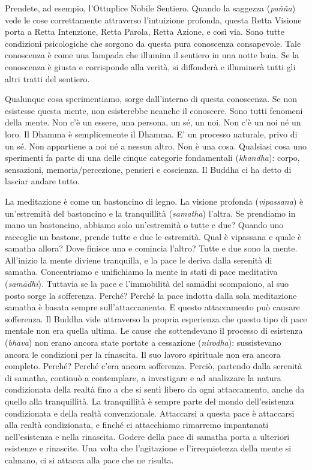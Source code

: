 Prendete, ad esempio, l'Ottuplice Nobile Sentiero. Quando la saggezza
(\emph{pañña}) vede le cose correttamente attraverso l'intuizione
profonda, questa Retta Visione porta a Retta Intenzione, Retta Parola,
Retta Azione, e così via. Sono tutte condizioni psicologiche che sorgono
da questa pura conoscenza consapevole. Tale conoscenza è come una
lampada che illumina il sentiero in una notte buia. Se la conoscenza è
giusta e corrisponde alla verità, si diffonderà e illuminerà tutti gli
altri tratti del sentiero.

Qualunque cosa sperimentiamo, sorge dall'interno di questa conoscenza.
Se non esistesse questa mente, non esisterebbe neanche il conoscere.
Sono tutti fenomeni della mente. Non c'è un essere, una persona, un sé,
un noi. Non c'è un noi né un loro. Il Dhamma è semplicemente il Dhamma.
E' un processo naturale, privo di un sé. Non appartiene a noi né a
nessun altro. Non è una cosa. Qualsiasi cosa uno sperimenti fa parte di
una delle cinque categorie fondamentali (\emph{khandha}): corpo,
sensazioni, memoria/percezione, pensieri e coscienza. Il Buddha ci ha
detto di lasciar andare tutto.

La meditazione è come un bastoncino di legno. La visione profonda
(\emph{vipassana}) è un'estremità del bastoncino e la tranquillità
(\emph{samatha}) l'altra. Se prendiamo in mano un bastoncino, abbiamo
solo un'estremità o tutte e due? Quando uno raccoglie un bastone, prende
tutte e due le estremità. Qual è vipassana e quale è samatha allora?
Dove finisce una e comincia l'altro? Tutte e due sono la mente.
All'inizio la mente diviene tranquilla, e la pace le deriva dalla
serenità di samatha. Concentriamo e unifichiamo la mente in stati di
pace meditativa (\emph{samādhi}). Tuttavia se la pace e l'immobilità del
samādhi scompaiono, al suo posto sorge la sofferenza. Perché? Perché la
pace indotta dalla sola meditazione samatha è basata sempre
sull'attaccamento. E questo attaccamento può causare sofferenza. Il
Buddha vide attraverso la propria esperienza che questo tipo di pace
mentale non era quella ultima. Le cause che sottendevano il processo di
esistenza (\emph{bhava}) non erano ancora state portate a cessazione
(\emph{nirodha}): sussistevano ancora le condizioni per la rinascita. Il
suo lavoro spirituale non era ancora completo. Perché? Perché c'era
ancora sofferenza. Perciò, partendo dalla serenità di samatha, continuò
a contemplare, a investigare e ad analizzare la natura condizionata
della realtà fino a che si sentì libero da ogni attaccamento, anche da
quello alla tranquillità. La tranquillità è sempre parte del mondo
dell'esistenza condizionata e della realtà convenzionale. Attaccarsi a
questa pace è attaccarsi alla realtà condizionata, e finché ci
attacchiamo rimarremo impantanati nell'esistenza e nella rinascita.
Godere della pace di samatha porta a ulteriori esistenze e rinascite.
Una volta che l'agitazione e l'irrequietezza della mente si calmano, ci
si attacca alla pace che ne risulta.

